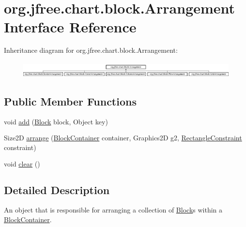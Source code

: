 \hypertarget{interfaceorg_1_1jfree_1_1chart_1_1block_1_1_arrangement}{}\section{org.\+jfree.\+chart.\+block.\+Arrangement Interface Reference}
\label{interfaceorg_1_1jfree_1_1chart_1_1block_1_1_arrangement}
Inheritance diagram for org.\+jfree.\+chart.\+block.\+Arrangement\+:\begin{figure}[H]
\begin{center}
\leavevmode
\includegraphics[height=0.878431cm]{interfaceorg_1_1jfree_1_1chart_1_1block_1_1_arrangement}
\end{center}
\end{figure}
\subsection*{Public Member Functions}
\begin{DoxyCompactItemize}
\item 
void \mbox{\hyperlink{interfaceorg_1_1jfree_1_1chart_1_1block_1_1_arrangement_ab9ba94da0c30233584985ff29d88b489}{add}} (\mbox{\hyperlink{interfaceorg_1_1jfree_1_1chart_1_1block_1_1_block}{Block}} block, Object key)
\item 
Size2D \mbox{\hyperlink{interfaceorg_1_1jfree_1_1chart_1_1block_1_1_arrangement_a898da14347266c2d9cfa3dd6dff4e2df}{arrange}} (\mbox{\hyperlink{classorg_1_1jfree_1_1chart_1_1block_1_1_block_container}{Block\+Container}} container, Graphics2D g2, \mbox{\hyperlink{classorg_1_1jfree_1_1chart_1_1block_1_1_rectangle_constraint}{Rectangle\+Constraint}} constraint)
\item 
void \mbox{\hyperlink{interfaceorg_1_1jfree_1_1chart_1_1block_1_1_arrangement_a4db8248d65d1c074b7cf5ecc35d0f097}{clear}} ()
\end{DoxyCompactItemize}


\subsection{Detailed Description}
An object that is responsible for arranging a collection of \mbox{\hyperlink{interfaceorg_1_1jfree_1_1chart_1_1block_1_1_block}{Block}}s within a \mbox{\hyperlink{classorg_1_1jfree_1_1chart_1_1block_1_1_block_container}{Block\+Container}}. 

